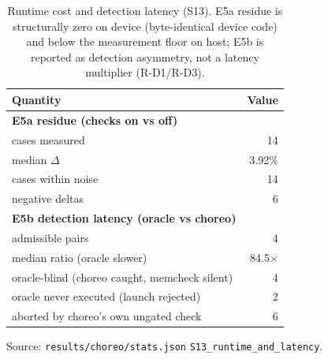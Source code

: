 \begin{table}[t]
\centering\footnotesize
\caption{Runtime cost and detection latency (S13). E5a residue is structurally zero on device (byte-identical device code) and below the measurement floor on host; E5b is reported as detection asymmetry, not a latency multiplier (R-D1/R-D3).}
\label{tab:rq3-runtime}
\begin{tabular}{@{}lr@{}}
\toprule
Quantity & Value \\
\midrule
\textbf{E5a residue (checks on vs off)} &  \\
cases measured & 14 \\
median $\Delta$ & 3.92\% \\
cases within noise & 14 \\
negative deltas & 6 \\
\textbf{E5b detection latency (oracle vs choreo)} &  \\
admissible pairs & 4 \\
median ratio (oracle slower) & 84.5$\times$ \\
oracle-blind (choreo caught, memcheck silent) & 4 \\
oracle never executed (launch rejected) & 2 \\
aborted by choreo's own ungated check & 6 \\
\bottomrule
\end{tabular}
\vspace{0.4em}\begin{minipage}{0.98\linewidth}\raggedright\footnotesize Source: \texttt{results/choreo/stats.json} \texttt{S13\_runtime\_and\_latency}.\end{minipage}
\end{table}
